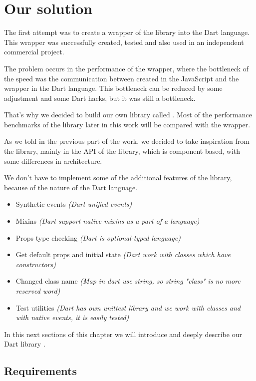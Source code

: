\chapter{Our solution}\label{chap:oursolution}

The first attempt was to create a wrapper of the \react library into the Dart language. 
This wrapper was successfully created, tested and also used in an independent commercial project. 

The problem occurs in the performance of the wrapper, 
where the bottleneck of the speed was the communication between \react created in the JavaScript and the wrapper in the Dart language. 
This bottleneck can be reduced by some adjustment and some Dart hacks, but it was still a bottleneck. 

That's why we decided to build our own library called \tiles.
Most of the performance benchmarks of the \tiles library later in this work will be compared with the \react wrapper. 

As we told in the previous part of the work, 
we decided to take inspiration from the \facebook \react library,
mainly in the API of the library, which is component based, 
with some differences in architecture.

We don't have to implement some of the additional features of the \react library, because of the nature of the Dart language.
\begin{itemize}
  \item Synthetic events \textit{(Dart unified events)}
  \item Mixins \textit{(Dart support native mixins as a part of a language)}
  \item Props type checking \textit{(Dart is optional-typed language)}
  \item Get default props and initial state \textit{(Dart work with classes which have constructors)}
  \item Changed class name \textit{(Map in dart use string, so string "class" is no more reserved word)}
  \item Test utilities \textit{(Dart has own unittest library and we work with classes and with native events, it is easily tested)}
\end{itemize}

In this next sections of this chapter we will introduce and deeply describe our Dart library \tiles.

\section{Requirements}\label{subsec:our-architecture-requirements}

